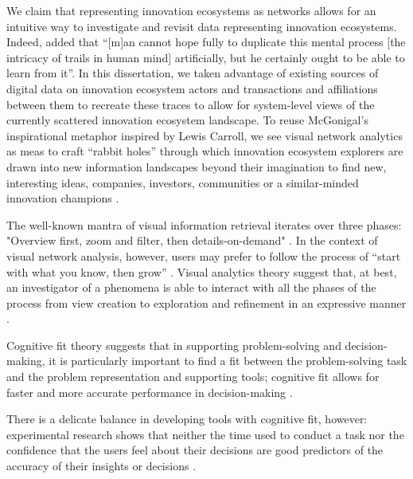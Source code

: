 We claim that representing innovation ecosystems as networks allows for an intuitive way to investigate and revisit data representing innovation ecosystems. Indeed, \citep{Bush1945} added that “[m]an cannot hope fully to duplicate this mental process [the intricacy of trails in human mind] artificially, but he certainly ought to be able to learn from it”. In this dissertation, we taken advantage of existing sources of digital data on innovation ecosystem actors and transactions and affiliations between them to recreate these traces to allow for system-level views of the currently scattered innovation ecosystem landscape. To reuse McGonigal’s \citeyearpar{McGonigal2005} inspirational metaphor inspired by Lewis Carroll, we see visual network analytics as meas to craft “rabbit holes” through which innovation ecosystem explorers are drawn into new information landscapes beyond their imagination to find new, interesting ideas, companies, investors, communities or a similar-minded innovation champions \citep[cf.][]{Huhtamaki2007}.

The well-known mantra of visual information retrieval iterates over three phases: "Overview first, zoom and filter, then details-on-demand" \citep{Shneiderman1996}.  
In the context of visual network analysis, however, users may prefer to follow the process of “start with what you know, then grow” \citep[][p. 35]{Heer2005}. Visual analytics theory suggest that, at best, an investigator of a phenomena is able to interact with all the phases of the process from view creation to exploration and refinement in an expressive manner \citep{Heer2012}.

Cognitive fit theory suggests that in supporting problem-solving and decision-making, it is particularly important to find a fit between the problem-solving task and the problem representation and supporting tools; cognitive fit allows for faster and more accurate performance in decision-making \citep{Vessey1991}. 

There is a delicate balance in developing tools with cognitive fit, however: experimental research shows that neither the time used to conduct a task nor the confidence that the users feel about their decisions are good predictors of the accuracy of their insights or decisions \citep[cf.][]{Dunn2001}. 


